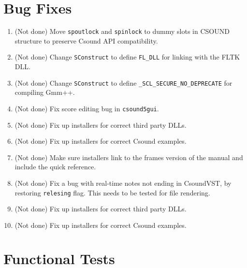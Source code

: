 \documentclass[11pt,letterpaper,onecolumn]{scrartcl}
\begin{document}
\begin{sloppypar}
\section{Bug Fixes}
\label{sec:BugFixes}

\begin{enumerate}
	\item (Not done) Move \texttt{spoutlock} and \texttt{spinlock} to dummy slots in CSOUND structure to preserve Csound API compatibility.
	\item (Not done) Change \texttt{SConstruct} to define \verb|FL_DLL| for linking with the FLTK DLL.
	\item (Not done) Change \texttt{SConstruct} to define \verb|_SCL_SECURE_NO_DEPRECATE| for compiling Gmm++.
	\item (Not done) Fix score editing bug in \texttt{csound5gui}.
	\item (Not done) Fix up installers for correct third party DLLs.
	\item (Not done) Fix up installers for correct Csound examples.
	\item (Not done) Make sure installers link to the frames version of the manual and include the quick reference.
	\item (Not done) Fix a bug with real-time notes not ending in CsoundVST, by restoring \texttt{relesing} flag. This needs to be tested for file rendering.
	\item (Not done) Fix up installers for correct third party DLLs.
	\item (Not done) Fix up installers for correct Csound examples.
\end{enumerate}

\section{Functional Tests}
\label{sec:FunctionalTests}


\end{sloppypar}
\end{document}
